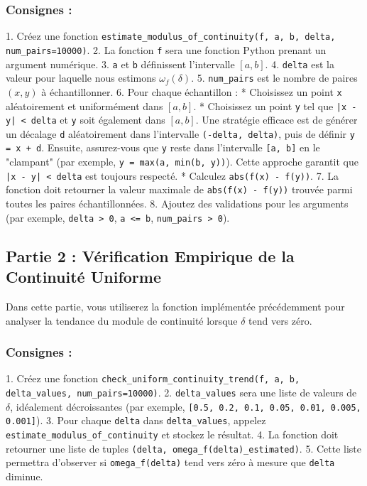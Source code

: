 \documentclass[12pt,a4paper]{report}
\begin{document}
\subsubsection{Consignes :}
1.  Créez une fonction \texttt{estimate\_modulus\_of\_continuity(f, a, b, delta, num\_pairs=10000)}.
2.  La fonction \texttt{f} sera une fonction Python prenant un argument numérique.
3.  \texttt{a} et \texttt{b} définissent l'intervalle $[a, b]$.
4.  \texttt{delta} est la valeur pour laquelle nous estimons $\omega_f(\delta)$.
5.  \texttt{num\_pairs} est le nombre de paires $(x, y)$ à échantillonner.
6.  Pour chaque échantillon :
    *   Choisissez un point \texttt{x} aléatoirement et uniformément dans $[a, b]$.
    *   Choisissez un point \texttt{y} tel que \texttt{|x - y| < delta} et \texttt{y} soit également dans $[a, b]$. Une stratégie efficace est de générer un décalage \texttt{d} aléatoirement dans l'intervalle \texttt{(-delta, delta)}, puis de définir \texttt{y = x + d}. Ensuite, assurez-vous que \texttt{y} reste dans l'intervalle \texttt{[a, b]} en le "clampant" (par exemple, \texttt{y = max(a, min(b, y))}). Cette approche garantit que \texttt{|x - y| < delta} est toujours respecté.
    *   Calculez \texttt{abs(f(x) - f(y))}.
7.  La fonction doit retourner la valeur maximale de \texttt{abs(f(x) - f(y))} trouvée parmi toutes les paires échantillonnées.
8.  Ajoutez des validations pour les arguments (par exemple, \texttt{delta > 0}, \texttt{a <= b}, \texttt{num\_pairs > 0}).

\subsection{Partie 2 : Vérification Empirique de la Continuité Uniforme}

Dans cette partie, vous utiliserez la fonction implémentée précédemment pour analyser la tendance du module de continuité lorsque $\delta$ tend vers zéro.

\subsubsection{Consignes :}
1.  Créez une fonction \texttt{check\_uniform\_continuity\_trend(f, a, b, delta\_values, num\_pairs=10000)}.
2.  \texttt{delta\_values} sera une liste de valeurs de $\delta$, idéalement décroissantes (par exemple, \texttt{[0.5, 0.2, 0.1, 0.05, 0.01, 0.005, 0.001]}).
3.  Pour chaque \texttt{delta} dans \texttt{delta\_values}, appelez \texttt{estimate\_modulus\_of\_continuity} et stockez le résultat.
4.  La fonction doit retourner une liste de tuples \texttt{(delta, omega\_f(delta)\_estimated)}.
5.  Cette liste permettra d'observer si \texttt{omega\_f(delta)} tend vers zéro à mesure que \texttt{delta} diminue.
\end{document}
